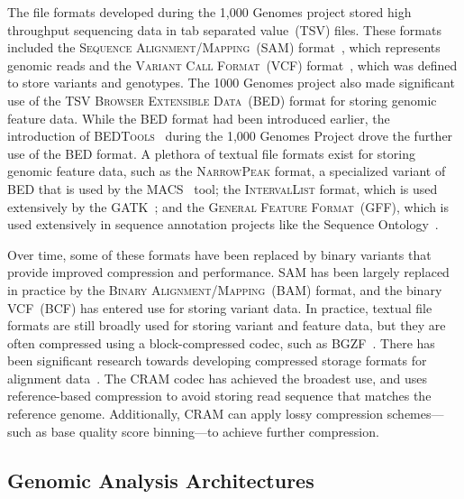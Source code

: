 \documentclass[phd]{ucbthesis}
\begin{document}
The file formats developed during the 1,000 Genomes project stored high
throughput sequencing data in tab separated value~(TSV) files. These
formats included the \textsc{Sequence Alignment/Mapping}~(SAM)
format~\cite{li09}, which represents genomic reads and the \textsc{Variant Call
  Format}~(VCF) format~\cite{danecek11}, which was defined to store variants
and genotypes. The 1000 Genomes project also made significant use of the
TSV \textsc{Browser Extensible Data}~(BED) format for storing genomic feature
data. While the BED format had been introduced earlier, the introduction of
\textsc{BEDTools}~\cite{quinlan10} during the 1,000 Genomes Project drove
the further use of the BED format. A plethora of textual file formats exist for
storing genomic feature data, such as the \textsc{NarrowPeak} format, a
specialized variant of BED that is used by the \textsc{MACS}~\cite{zhang08}
tool; the \textsc{IntervalList} format, which is used extensively by the
\textsc{GATK}~\cite{depristo11}; and the \textsc{General Feature Format}~(GFF),
which is used extensively in sequence annotation projects like the Sequence
Ontology~\cite{eilbeck05}.

Over time, some of these formats have been replaced by binary variants that
provide improved compression and performance. SAM has been largely replaced
in practice by the \textsc{Binary Alignment/Mapping}~(BAM) format, and the
binary VCF~(BCF) has entered use for storing variant data. In practice,
textual file formats are still broadly used for storing variant and feature
data, but they are often compressed using a block-compressed codec, such as
BGZF~\cite{li11tabix}. There has been significant research towards developing
compressed storage formats for alignment data~\cite{kozanitis11, fritz11}.
The CRAM codec has achieved the broadest use, and uses reference-based
compression to avoid storing read sequence that matches the reference genome.
Additionally, CRAM can apply lossy compression schemes---such as base quality
score binning---to achieve further compression.

\subsection{Genomic Analysis Architectures}
\label{sec:genomic-architectures}
\end{document}
